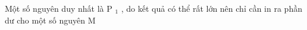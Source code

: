 Một số nguyên duy nhất là P   $_    1   $   , do kết quả có thể rất lớn nên chỉ cần in ra phần dư cho một số nguyên M